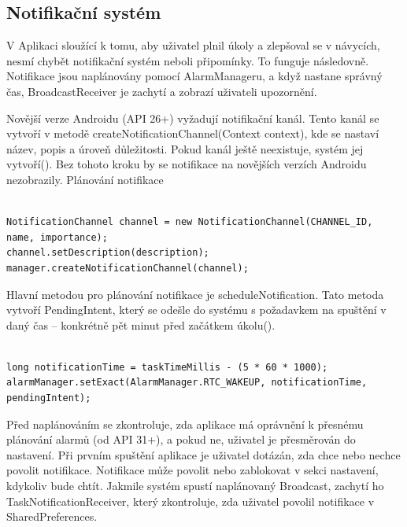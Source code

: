 \subsection{Notifikační systém}
\hspace{14pt} V Aplikaci sloužící k tomu, aby uživatel plnil úkoly a zlepšoval se v návycích, nesmí chybět notifikační systém neboli připomínky. To funguje následovně. Notifikace jsou naplánovány pomocí AlarmManageru, a když nastane správný čas, BroadcastReceiver je zachytí a zobrazí uživateli upozornění.

Novější verze Androidu (API 26+) vyžadují notifikační kanál. Tento kanál se vytvoří v metodě createNotificationChannel(Context context), kde se nastaví název, popis a úroveň důležitosti. Pokud kanál ještě neexistuje, systém jej vytvoří(). Bez tohoto kroku by se notifikace na novějších verzích Androidu nezobrazily.
Plánování notifikace

\begin{lstlisting}[style=javastyle,caption = {NotificationChannel},label = {lst:NotificationChannel}]

NotificationChannel channel = new NotificationChannel(CHANNEL_ID, name, importance);
channel.setDescription(description);
manager.createNotificationChannel(channel);

\end{lstlisting}

Hlavní metodou pro plánování notifikace je scheduleNotification. Tato metoda vytvoří PendingIntent, který se odešle do systému s požadavkem na spuštění v daný čas – konkrétně pět minut před začátkem úkolu().

\begin{lstlisting}[style=javastyle,caption = {alarmManager},label = {alarmManagere}]

long notificationTime = taskTimeMillis - (5 * 60 * 1000);
alarmManager.setExact(AlarmManager.RTC_WAKEUP, notificationTime, pendingIntent);

\end{lstlisting}

Před naplánováním se zkontroluje, zda aplikace má oprávnění k přesnému plánování alarmů (od API 31+), a pokud ne, uživatel je přesměrován do nastavení. Při prvním spuštění aplikace je uživatel dotázán, zda chce nebo nechce povolit notifikace. Notifikace může povolit nebo zablokovat v sekci nastavení, kdykoliv bude chtít. Jakmile systém spustí naplánovaný Broadcast, zachytí ho TaskNotificationReceiver, který zkontroluje, zda uživatel povolil notifikace v SharedPreferences.
\newpage

